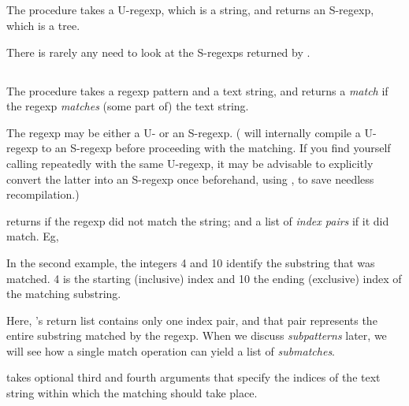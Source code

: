 {\subsection{}

The procedure  takes
a U-regexp, which is a string, and returns
an S-regexp, which is a tree.


\n There is rarely any need to look at the S-regexps
returned by .

\subsection{}

The procedure  takes
a
regexp pattern and a text string, and returns a {\em
match} if the regexp {\em matches} (some part of) the text string.

The regexp may be either a U- or an S-regexp.
( will internally compile a
U-regexp to an S-regexp before proceeding with the
matching.  If you find yourself calling
 repeatedly with the same
U-regexp, it may be advisable to explicitly convert the
latter into an S-regexp once beforehand, using
, to save needless recompilation.)

 returns  if the regexp did not
match the string; and a list of {\em index pairs} if it
did match.  Eg,


\n In the second example, the integers 4 and 10 identify
the substring that was matched. 4 is the starting
(inclusive) index and 10 the ending (exclusive) index of
the matching substring.


Here, 's return list contains only
one index pair, and that pair represents the entire
substring matched by the regexp.  When we discuss
{\em subpatterns} later, we will see how a single match
operation can yield a list of {\em submatches}.

 takes optional third
and fourth arguments that specify the indices of
the text string within which the matching should
take place.

}
